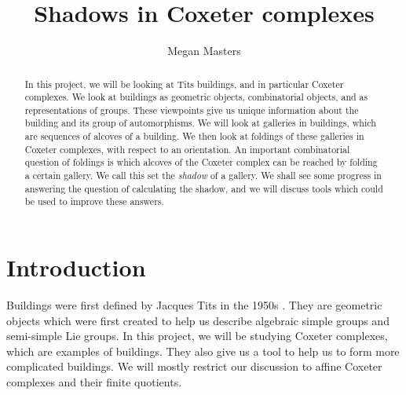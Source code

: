 \documentclass[11pt]{article}
\begin{document}
\newtheorem{theorem}{Theorem}
\theoremstyle{definition}
\newtheorem{definition}{Definition}
\newtheorem{proposition}{Proposition}
\newtheorem{example}{Example}
\newtheorem{lemma}{Lemma}
\newtheorem{corollary}{Corollary}
\newcommand{\uw}{\mathcal{U}(W,X)}
\newcommand{\W}{$(W,S)$}
\newcommand{\ix}{\textit}
\newcommand{\tr}{\textcolor{red}}
\newcommand{\sg}{$\Sigma$}


\title{Shadows in Coxeter complexes}
\author{Megan Masters}
\maketitle



\begin{abstract}
    


In this project, we will be looking at Tits buildings, and in particular Coxeter complexes. We look at buildings as geometric objects, combinatorial objects, and as representations of groups. These viewpoints give us unique information about the building and its group of automorphisms. We will look at galleries in buildings, which are sequences of alcoves of a building. We then look at foldings of these galleries in Coxeter complexes, with respect to an orientation. An important combinatorial question of foldings is which alcoves of the Coxeter complex can be reached by folding a certain gallery. We call this set the \ix{shadow} of a gallery. We shall see some progress in answering the question of calculating the shadow, and we will discuss tools which could be used to improve these answers. 

 \end{abstract}
\tableofcontents
\section{Introduction}
Buildings were first defined by Jacques Tits in the 1950s \cite{TITS}. They are geometric objects which were first created to help us describe algebraic simple groups and semi-simple Lie groups. In this project, we will be studying Coxeter complexes, which are examples of buildings. They also give us a tool to help us to form more complicated buildings. We will mostly restrict our discussion to affine Coxeter complexes and their finite quotients.
\end{document}
